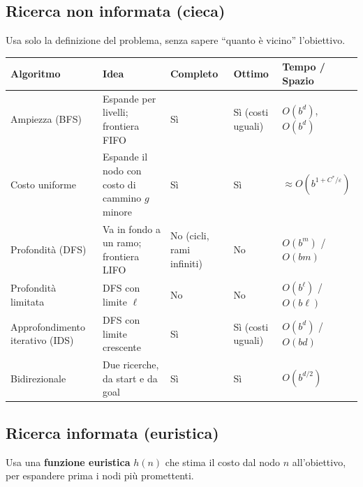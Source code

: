 \subsection{Ricerca non informata (cieca)}
Usa solo la definizione del problema, senza sapere ``quanto è vicino'' l'obiettivo.

\begin{center}
\small
\begin{tabularx}{\textwidth}{@{}>{\raggedright\arraybackslash}p{2.6cm}X>{\raggedright\arraybackslash}p{1.9cm}>{\raggedright\arraybackslash}p{1.9cm}>{\raggedright\arraybackslash}p{2.6cm}@{}}
\toprule
\textbf{Algoritmo} & \textbf{Idea} & \textbf{Completo} & \textbf{Ottimo} & \textbf{Tempo / Spazio} \\
\midrule
Ampiezza (BFS) & Espande per livelli; frontiera FIFO & Sì & Sì (costi uguali) & $O(b^d)$, $O(b^d)$ \\
Costo uniforme & Espande il nodo con costo di cammino $g$ minore & Sì & Sì & $\approx O(b^{1+C^*/\varepsilon})$ \\
Profondità (DFS) & Va in fondo a un ramo; frontiera LIFO & No (cicli, rami infiniti) & No & $O(b^m)$ / $O(bm)$ \\
Profondità limitata & DFS con limite $\ell$ & No & No & $O(b^\ell)$ / $O(b\ell)$ \\
Approfondimento iterativo (IDS) & DFS con limite crescente & Sì & Sì (costi uguali) & $O(b^d)$ / $O(bd)$ \\
Bidirezionale & Due ricerche, da start e da goal & Sì & Sì & $O(b^{d/2})$ \\
\bottomrule
\end{tabularx}
\end{center}

\subsection{Ricerca informata (euristica)}
Usa una \textbf{funzione euristica} $h(n)$ che stima il costo dal nodo $n$ all'obiettivo, per espandere prima i nodi più promettenti.

